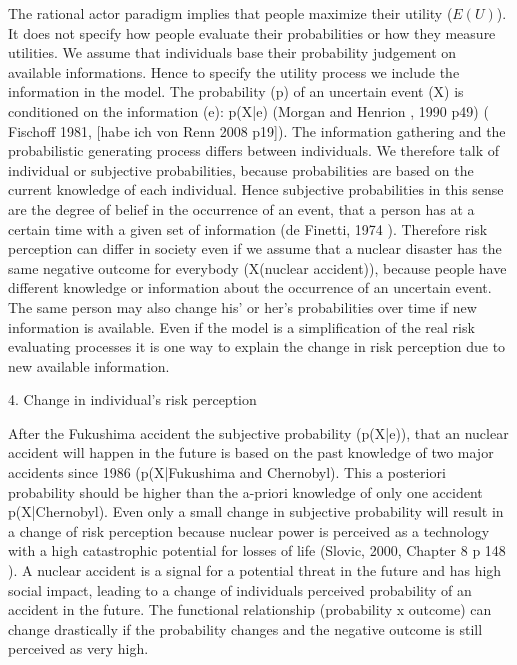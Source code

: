 The rational actor paradigm  implies that people maximize their utility ($E(U)$). It does not specify how people evaluate their probabilities or how they measure utilities. We assume that individuals base their probability judgement on available informations. Hence to specify the utility process we include the information in the model. The probability (p) of an uncertain event (X) is conditioned on the information (e): p(X|e) (Morgan and Henrion , 1990 p49) ( Fischoff 1981, \citep{Fischhoff:1981tx} [habe ich von Renn 2008 p19]). The information gathering and the probabilistic generating process differs between individuals. We therefore talk of individual or subjective probabilities, because probabilities are based on the current knowledge of each individual. Hence subjective probabilities in this sense are the degree of belief in the occurrence of an event, that a person has at a certain time with a given set of information  (de Finetti, 1974 \citep{deFinetti:1974ua}).   
Therefore risk perception can differ in society even if we assume that a nuclear disaster has the same negative outcome for everybody (X(nuclear accident)), because people have different knowledge or information about the occurrence of an uncertain event. The same person may also change his' or her's probabilities over time if new information is available. Even if the model is a simplification of the real risk evaluating processes it is one way to explain the change in risk perception due to new available information. 



4. Change in individual's risk perception

After the Fukushima accident the subjective probability (p(X|e)), that an nuclear accident will happen in the future is based on the past knowledge of two major accidents since 1986 (p(X|Fukushima and Chernobyl). This a posteriori probability should be higher than the a-priori knowledge of only one accident p(X|Chernobyl). Even only a small change in subjective probability will result in a change of risk perception because nuclear power is perceived as a technology with a high catastrophic potential for losses of life (Slovic, 2000, Chapter 8 p 148   \citep[148]{Slovic:2000tx}). A nuclear accident is a signal for a potential threat in the future and has high social impact, leading to a change of individuals perceived probability of an accident in the future. The functional relationship (probability x outcome) can change drastically if the  probability changes and the negative outcome is still perceived as very high.  

